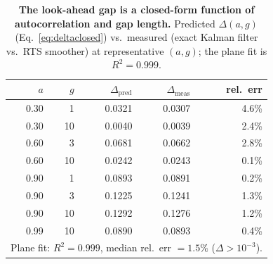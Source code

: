 \begin{table}[t]\centering\small
\setlength{\tabcolsep}{6pt}
\caption{\textbf{The look-ahead gap is a closed-form function of autocorrelation and gap length.} Predicted $\Delta(a,g)$ (Eq.~\ref{eq:deltaclosed}) vs.\ measured (exact Kalman filter vs.\ RTS smoother) at representative $(a,g)$; the plane fit is $R^2{=}0.999$.}
\label{tab:gaptheory}
\begin{tabular}{rrrrr}
\toprule
$a$ & $g$ & $\Delta_{\mathrm{pred}}$ & $\Delta_{\mathrm{meas}}$ & rel.\ err \\
\midrule
0.30 & 1 & 0.0321 & 0.0307 & 4.6\% \\
0.30 & 10 & 0.0040 & 0.0039 & 2.4\% \\
0.60 & 3 & 0.0681 & 0.0662 & 2.8\% \\
0.60 & 10 & 0.0242 & 0.0243 & 0.1\% \\
0.90 & 1 & 0.0893 & 0.0891 & 0.2\% \\
0.90 & 3 & 0.1225 & 0.1241 & 1.3\% \\
0.90 & 10 & 0.1292 & 0.1276 & 1.2\% \\
0.99 & 10 & 0.0890 & 0.0893 & 0.4\% \\
\midrule
\multicolumn{5}{l}{\footnotesize Plane fit: $R^2=0.999$, median rel.\ err $=1.5\%$ ($\Delta>10^{-3}$).} \\
\bottomrule
\end{tabular}
\end{table}

